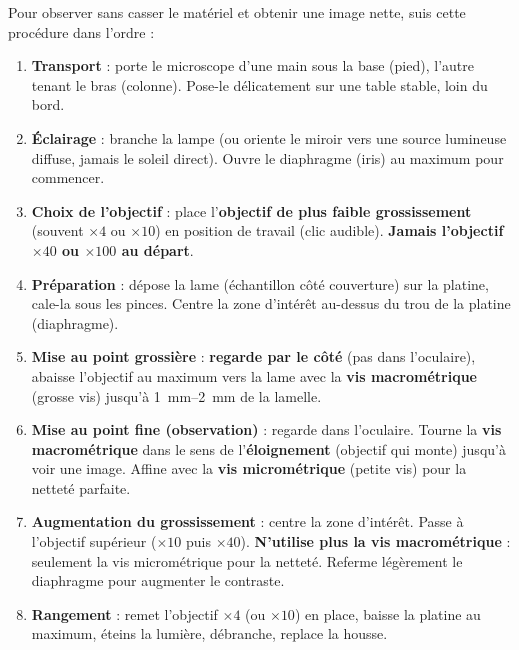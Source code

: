 \documentclass[11pt]{article}
\begin{document}
\begin{methode}
Pour observer sans casser le matériel et obtenir une image nette, suis cette procédure dans l'ordre :
\begin{enumerate}
    \item \textbf{Transport} : porte le microscope d'une main sous la base (pied), l'autre tenant le bras (colonne). Pose-le délicatement sur une table stable, loin du bord.
    \item \textbf{Éclairage} : branche la lampe (ou oriente le miroir vers une source lumineuse diffuse, jamais le soleil direct). Ouvre le diaphragme (iris) au maximum pour commencer.
    \item \textbf{Choix de l'objectif} : place l'\textbf{objectif de plus faible grossissement} (souvent \textbf{$\times 4$} ou \textbf{$\times 10$}) en position de travail (clic audible). \textbf{Jamais l'objectif $\times 40$ ou $\times 100$ au départ}.
    \item \textbf{Préparation} : dépose la lame (échantillon côté couverture) sur la platine, cale-la sous les pinces. Centre la zone d'intérêt au-dessus du trou de la platine (diaphragme).
    \item \textbf{Mise au point grossière} : \textbf{regarde par le côté} (pas dans l'oculaire), abaisse l'objectif au maximum vers la lame avec la \textbf{vis macrométrique} (grosse vis) jusqu'à \SI{1}{\milli\meter}--\SI{2}{\milli\meter} de la lamelle.
    \item \textbf{Mise au point fine (observation)} : regarde dans l'oculaire. Tourne la \textbf{vis macrométrique} dans le sens de l'\textbf{éloignement} (objectif qui monte) jusqu'à voir une image. Affine avec la \textbf{vis micrométrique} (petite vis) pour la netteté parfaite.
    \item \textbf{Augmentation du grossissement} : centre la zone d'intérêt. Passe à l'objectif supérieur ($\times 10$ puis $\times 40$). \textbf{N'utilise plus la vis macrométrique} : seulement la vis micrométrique pour la netteté. Referme légèrement le diaphragme pour augmenter le contraste.
    \item \textbf{Rangement} : remet l'objectif $\times 4$ (ou $\times 10$) en place, baisse la platine au maximum, éteins la lumière, débranche, replace la housse.
\end{enumerate}
\end{methode}
\end{document}
